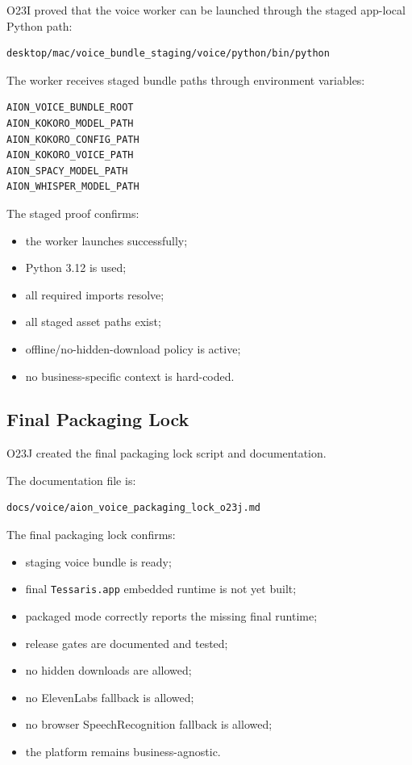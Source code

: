 O23I proved that the voice worker can be launched through the staged app-local Python path:

\begin{verbatim}
desktop/mac/voice_bundle_staging/voice/python/bin/python
\end{verbatim}

The worker receives staged bundle paths through environment variables:

\begin{verbatim}
AION_VOICE_BUNDLE_ROOT
AION_KOKORO_MODEL_PATH
AION_KOKORO_CONFIG_PATH
AION_KOKORO_VOICE_PATH
AION_SPACY_MODEL_PATH
AION_WHISPER_MODEL_PATH
\end{verbatim}

The staged proof confirms:

\begin{itemize}
  \item the worker launches successfully;
  \item Python 3.12 is used;
  \item all required imports resolve;
  \item all staged asset paths exist;
  \item offline/no-hidden-download policy is active;
  \item no business-specific context is hard-coded.
\end{itemize}

\subsection{Final Packaging Lock}

O23J created the final packaging lock script and documentation.

The documentation file is:

\begin{verbatim}
docs/voice/aion_voice_packaging_lock_o23j.md
\end{verbatim}

The final packaging lock confirms:

\begin{itemize}
  \item staging voice bundle is ready;
  \item final \texttt{Tessaris.app} embedded runtime is not yet built;
  \item packaged mode correctly reports the missing final runtime;
  \item release gates are documented and tested;
  \item no hidden downloads are allowed;
  \item no ElevenLabs fallback is allowed;
  \item no browser SpeechRecognition fallback is allowed;
  \item the platform remains business-agnostic.
\end{itemize}

